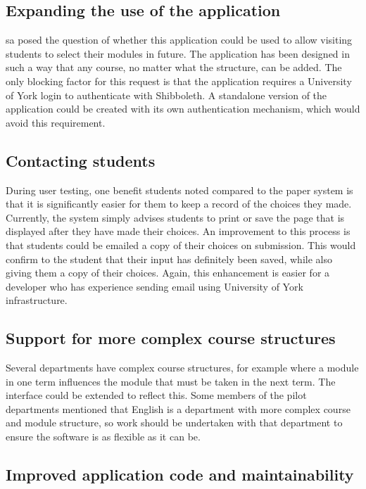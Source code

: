 \subsection{Expanding the use of the application}

\gls{sa} posed the question of whether this application could be used to allow
visiting students to select their modules in future. The application has been
designed in such a way that any course, no matter what the structure, can be
added. The only blocking factor for this request is that the application
requires a University of York login to authenticate with Shibboleth. A
standalone version of the application could be created with its own
authentication mechanism, which would avoid this requirement.

\subsection{Contacting students}

During user testing, one benefit students noted compared to the paper system
is that it is significantly easier for them to keep a record of the choices
they made. Currently, the system simply advises students to print or save the
page that is displayed after they have made their choices. An improvement to
this process is that students could be emailed a copy of their choices on
submission. This would confirm to the student that their input has definitely
been saved, while also giving them a copy of their choices. Again, this
enhancement is easier for a developer who has experience sending email using
University of York infrastructure.

\subsection{Support for more complex course structures}

Several departments have complex course structures, for example where a module
in one term influences the module that must be taken in the next term. The
interface could be extended to reflect this. Some members of the pilot
departments mentioned that English is a department with more complex course
and module structure, so work should be undertaken with that department to
ensure the software is as flexible as it can be.

\subsection{Improved application code and maintainability}

